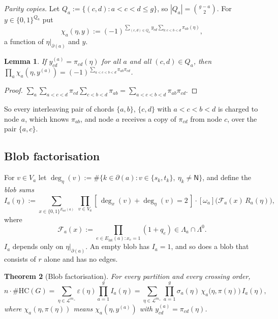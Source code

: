 \documentclass[11pt]{amsart}
\theoremstyle{plain}
\newtheorem{theorem}{Theorem}[section]
\newtheorem{lemma}[theorem]{Lemma}
\theoremstyle{definition}
\theoremstyle{remark}
\numberwithin{equation}{section}
\newcommand{\HC}{\#\mathrm{HC}}
\newcommand{\cL}{\mathcal{L}}
\newcommand{\cF}{\mathcal{F}}
\newcommand{\topc}[2]{[#1]\bigl(#2\bigr)}
\newcommand{\lab}[1]{\mathsf{#1}}
\newcommand{\Eint}{E_{\mathrm{int}}}
\newcommand{\mx}{m_{\times}}
\newcommand{\Ind}[1]{[\,#1\,]}
\begin{document}
\emph{Parity copies.} Let $Q_a:=\{(c,d) : a<c<d\le g\}$, so $|Q_a|=\binom{g-a}{2}$. For
$y\in\{0,1\}^{Q_a}$ put
\[
  \chi_a(\eta,y):=(-1)^{\sum_{(c,d)\in Q_a}y_{cd}\sum_{b\colon c<b<d}\pi_{ab}(\eta)},
\]
a function of $\eta|_{\partial(a)}$ and $y$.

\begin{lemma}\label{lem:copies}
If $y^{(a)}_{cd}=\pi_{cd}(\eta)$ for all $a$ and all $(c,d)\in Q_a$, then
$\prod_a\chi_a(\eta,y^{(a)})=(-1)^{\sum_{a<c<b<d}\pi_{ab}\pi_{cd}}$.
\end{lemma}

\begin{proof}
$\sum_a\sum_{a<c<d}\pi_{cd}\sum_{c<b<d}\pi_{ab}=\sum_{a<c<b<d}\pi_{ab}\pi_{cd}$.
\end{proof}

So every interleaving pair of chords $\{a,b\}$, $\{c,d\}$ with $a<c<b<d$ is charged to node $a$,
which knows $\pi_{ab}$, and node $a$ receives a copy of $\pi_{cd}$ from node $c$, over the pair
$\{a,c\}$.

\subsection{Blob factorisation}
For $v\in V_a$ let $\deg_\eta(v):=\#\{k\in\partial(a): v\in\{s_k,t_k\},\ \eta_k\ne\lab N\}$, and
define the \emph{blob sums}
\[
  I_a(\eta):=\sum_{x\in\{0,1\}^{\Eint(a)}}\ \prod_{v\in V_a}\Ind{\deg_x(v)+\deg_\eta(v)=2}\cdot
  \topc{\omega_a}{\cF_a(x)\,R_a(\eta)},
\]
where
\[
  \cF_a(x):=\prod_{e\in\Eint(a)\colon x_e=1}(1+q_e)\in\Lambda_a\cap\Lambda^0 .
\]
$I_a$ depends only on $\eta|_{\partial(a)}$. An empty blob has $I_a=1$, and so does a blob that
consists of $r$ alone and has no edges.

\begin{theorem}[Blob factorisation]\label{thm:blob}
For every partition and every crossing order,
\[
  n\cdot\HC(G)=\sum_{\eta\in\cL^{\mx}}\varepsilon(\eta)\prod_{a=1}^{g}I_a(\eta)
  =\sum_{\eta\in\cL^{\mx}}\prod_{a=1}^{g}\sigma_a(\eta)\,\chi_a\bigl(\eta,\pi(\eta)\bigr)\,I_a(\eta),
\]
where $\chi_a(\eta,\pi(\eta))$ means $\chi_a(\eta,y^{(a)})$ with $y^{(a)}_{cd}=\pi_{cd}(\eta)$.
\end{theorem}
\end{document}
